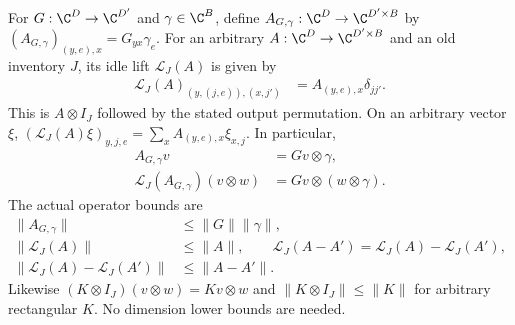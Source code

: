 \begin{definition}
    \label{def:construction_idle_gates}
    \leanok
    For $G:\C^D\to\C^{D'}$ and $\gamma\in\C^B$, define
    $A_{G,\gamma}:\C^D\to\C^{D'\times B}$ by
    $(A_{G,\gamma})_{(y,e),x}=G_{yx}\gamma_e$.
    For an arbitrary $A:\C^D\to\C^{D'\times B}$ and an old inventory
    $J$, its idle lift $\mathcal L_J(A)$ is given by
    \begin{align}
        \mathcal L_J(A)_{(y,(j,e)),(x,j')}
         & =A_{(y,e),x}\delta_{jj'}.
        \label{eq:construction_idle_coefficients}
    \end{align}
    This is $A\otimes I_J$ followed by the stated output permutation.
    On an arbitrary vector $\xi$,
    $(\mathcal L_J(A)\xi)_{y,j,e}=\sum_x A_{(y,e),x}\xi_{x,j}$.
    In particular,
    \begin{align}
        A_{G,\gamma}v & =Gv\otimes\gamma,
        \label{eq:construction_append_action}       \\
        \mathcal L_J(A_{G,\gamma})(v\otimes w)
                      & =Gv\otimes(w\otimes\gamma).
        \label{eq:construction_idle_action}
    \end{align}
    The actual operator bounds are
    \begin{align}
        \lVert A_{G,\gamma}\rVert   & \leq\lVert G\rVert\lVert\gamma\rVert,
        \label{eq:construction_append_norm}                                 \\
        \lVert\mathcal L_J(A)\rVert & \leq\lVert A\rVert,
        \qquad
        \mathcal L_J(A-A')=\mathcal L_J(A)-\mathcal L_J(A'),
        \label{eq:construction_idle_norm}                                   \\
        \lVert\mathcal L_J(A)-\mathcal L_J(A')\rVert
                                    & \leq\lVert A-A'\rVert.
        \label{eq:construction_idle_error}
    \end{align}
    Likewise $(K\otimes I_J)(v\otimes w)=Kv\otimes w$ and
    $\lVert K\otimes I_J\rVert\leq\lVert K\rVert$ for arbitrary
    rectangular $K$. No dimension lower bounds are needed.
\end{definition}

